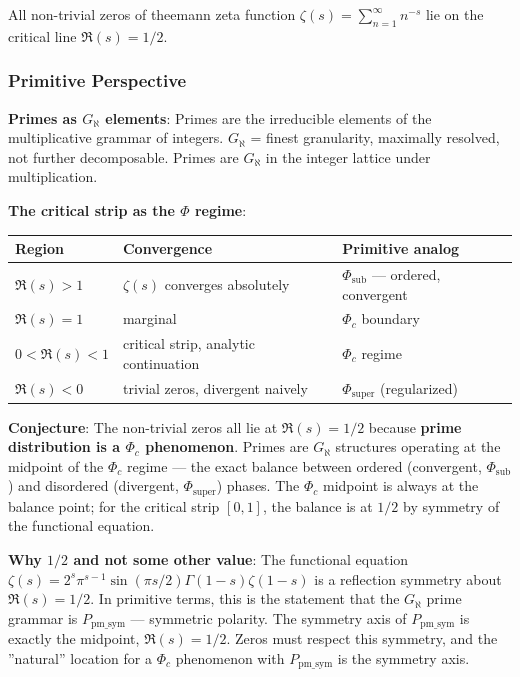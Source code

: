 \documentclass[12pt,a4paper]{article}
\begin{document}
All non-trivial zeros of theemann zeta function $\zeta(s) = \sum_{n=1}^{\infty} n^{-s}$ lie on the critical line $\Re(s) = 1/2$.

\subsubsection{Primitive Perspective}

\textbf{Primes as $G_{\aleph}$ elements}: Primes are the irreducible elements of the multiplicative grammar of integers. $G_{\aleph}$ = finest granularity, maximally resolved, not further decomposable. Primes are $G_{\aleph}$ in the integer lattice under multiplication.

\textbf{The critical strip as the $\Phi$ regime}:

\begin{table}[htbp]
\centering
\small
{}
\begin{tabularx}{\textwidth}{>{\centering\arraybackslash}X >{\centering\arraybackslash}X >{\centering\arraybackslash}X}
\toprule
\rowcolor{gray!25}\textbf{Region} & \textbf{Convergence} & \textbf{Primitive analog} \\
\midrule
\rowcolors{1}{white}{gray!10}
$\Re(s) > 1$ & $\zeta(s)$ converges absolutely & $\Phi_{\text{sub}}$ --- ordered, convergent \\
$\Re(s) = 1$ & marginal & $\Phi_c$ boundary \\
$0 < \Re(s) < 1$ & critical strip, analytic continuation & $\Phi_c$ regime \\
$\Re(s) < 0$ & trivial zeros, divergent naively & $\Phi_{\text{super}}$ (regularized) \\
\bottomrule
\end{tabularx}
\end{table}

\textbf{Conjecture}: The non-trivial zeros all lie at $\Re(s) = 1/2$ because \textbf{prime distribution is a $\Phi_c$ phenomenon}. Primes are $G_{\aleph}$ structures operating at the midpoint of the $\Phi_c$ regime --- the exact balance between ordered (convergent, $\Phi_{\text{sub}}$) and disordered (divergent, $\Phi_{\text{super}}$) phases. The $\Phi_c$ midpoint is always at the balance point; for the critical strip $[0,1]$, the balance is at $1/2$ by symmetry of the functional equation.

\textbf{Why $1/2$ and not some other value}: The functional equation $\zeta(s) = 2^s \pi^{s-1} \sin(\pi s/2) \Gamma(1-s) \zeta(1-s)$ is a reflection symmetry about $\Re(s) = 1/2$. In primitive terms, this is the statement that the $G_{\aleph}$ prime grammar is \textbf{$P_{\text{pm\_sym}}$} --- symmetric polarity. The symmetry axis of $P_{\text{pm\_sym}}$ is exactly the midpoint, $\Re(s) = 1/2$. Zeros must respect this symmetry, and the ''natural'' location for a $\Phi_c$ phenomenon with $P_{\text{pm\_sym}}$ is the symmetry axis.
\end{document}
